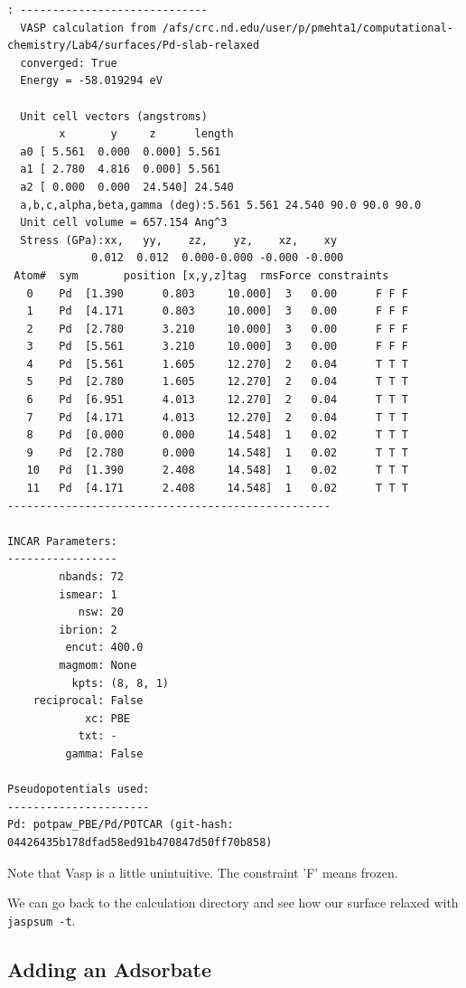 \documentclass[11pt]{article}
\begin{document}
\begin{verbatim}
: -----------------------------
  VASP calculation from /afs/crc.nd.edu/user/p/pmehta1/computational-chemistry/Lab4/surfaces/Pd-slab-relaxed
  converged: True
  Energy = -58.019294 eV

  Unit cell vectors (angstroms)
        x       y     z      length
  a0 [ 5.561  0.000  0.000] 5.561
  a1 [ 2.780  4.816  0.000] 5.561
  a2 [ 0.000  0.000  24.540] 24.540
  a,b,c,alpha,beta,gamma (deg):5.561 5.561 24.540 90.0 90.0 90.0
  Unit cell volume = 657.154 Ang^3
  Stress (GPa):xx,   yy,    zz,    yz,    xz,    xy
             0.012  0.012  0.000-0.000 -0.000 -0.000
 Atom#  sym       position [x,y,z]tag  rmsForce constraints
   0    Pd  [1.390      0.803     10.000]  3   0.00      F F F
   1    Pd  [4.171      0.803     10.000]  3   0.00      F F F
   2    Pd  [2.780      3.210     10.000]  3   0.00      F F F
   3    Pd  [5.561      3.210     10.000]  3   0.00      F F F
   4    Pd  [5.561      1.605     12.270]  2   0.04      T T T
   5    Pd  [2.780      1.605     12.270]  2   0.04      T T T
   6    Pd  [6.951      4.013     12.270]  2   0.04      T T T
   7    Pd  [4.171      4.013     12.270]  2   0.04      T T T
   8    Pd  [0.000      0.000     14.548]  1   0.02      T T T
   9    Pd  [2.780      0.000     14.548]  1   0.02      T T T
   10   Pd  [1.390      2.408     14.548]  1   0.02      T T T
   11   Pd  [4.171      2.408     14.548]  1   0.02      T T T
--------------------------------------------------

INCAR Parameters:
-----------------
        nbands: 72
        ismear: 1
           nsw: 20
        ibrion: 2
         encut: 400.0
        magmom: None
          kpts: (8, 8, 1)
    reciprocal: False
            xc: PBE
           txt: -
         gamma: False

Pseudopotentials used:
----------------------
Pd: potpaw_PBE/Pd/POTCAR (git-hash: 04426435b178dfad58ed91b470847d50ff70b858)
\end{verbatim}

Note that Vasp is a little unintuitive. The constraint 'F' means frozen.

We can go back to the calculation directory and see how our surface relaxed with \verb~jaspsum -t~.



\subsection{Adding an Adsorbate}
\label{sec-3-3}
\end{document}
